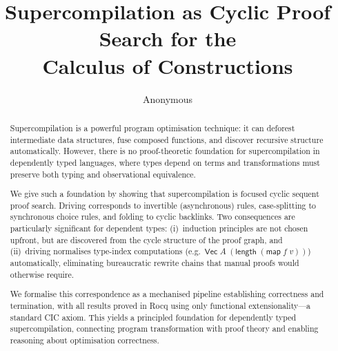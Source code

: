 \documentclass[runningheads]{llncs}
\title{Supercompilation as Cyclic Proof Search for the\\Calculus of Constructions}
\author{Anonymous}
\begin{document}
\maketitle

\begin{abstract}
Supercompilation is a powerful program optimisation technique: it can deforest intermediate data structures, fuse composed functions, and discover recursive structure automatically. However, there is no proof-theoretic foundation for supercompilation in dependently typed languages, where types depend on terms and transformations must preserve both typing and observational equivalence.

We give such a foundation by showing that supercompilation is focused cyclic sequent proof search. Driving corresponds to invertible (asynchronous) rules, case-splitting to synchronous choice rules, and folding to cyclic backlinks. Two consequences are particularly significant for dependent types: (i)~induction principles are not chosen upfront, but are discovered from the cycle structure of the proof graph, and (ii)~driving normalises type-index computations (e.g.\ $\mathsf{Vec}\;A\;(\mathsf{length}\;(\mathsf{map}\;f\;v))$) automatically, eliminating bureaucratic rewrite chains that manual proofs would otherwise require.

We formalise this correspondence as a mechanised pipeline establishing correctness and termination, with all results proved in Rocq using only functional extensionality---a standard CIC axiom. This yields a principled foundation for dependently typed supercompilation, connecting program transformation with proof theory and enabling reasoning about optimisation correctness.
\end{abstract}














\appendix

\end{document}
